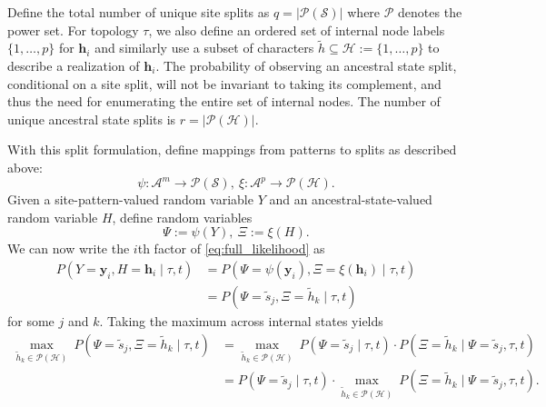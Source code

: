 \documentclass[a4paper]{article}
\newcommand{\alphabet}{\mathcal{A}}
\newcommand{\alignmentColumn}{\mathbf{y}}
\newcommand{\alignmentColumnRV}{Y}
\newcommand{\siteSplit}{\tilde{s}}
\newcommand{\siteSplitSet}{\mathcal{S}}
\newcommand{\ancestralStateColumn}{\mathbf{h}}
\newcommand{\ancestralStateColumnRV}{H}
\newcommand{\ancestralSplit}{\tilde{h}}
\newcommand{\ancestralSplitSet}{\mathcal{H}}
\newcommand{\patternToSplit}{\psi}
\newcommand{\ancestralToSplit}{\xi}
\newcommand{\siteSplitRV}{\Psi}
\newcommand{\ancestralSplitRV}{\Xi}
\newcommand{\nSiteRows}{m}
\newcommand{\nAncestralStateRows}{p}
\newcommand{\nSiteSplits}{q}
\newcommand{\nAncestralSplits}{r}
\begin{document}
Define the total number of unique site splits as $\nSiteSplits=|\mathcal{P}(\siteSplitSet)|$ where $\mathcal{P}$ denotes the power set.
For topology $\tau$, we also define an ordered set of internal node labels $\{1,\ldots,\nAncestralStateRows\}$ for $\ancestralStateColumn_i$ and similarly use a subset of characters $\ancestralSplit\subseteq\ancestralSplitSet:=\{1,\ldots,\nAncestralStateRows\}$ to describe a realization of $\ancestralStateColumn_i$.
The probability of observing an ancestral state split, conditional on a site split, will not be invariant to taking its complement, and thus the need for enumerating the entire set of internal nodes.
The number of unique ancestral state splits is $\nAncestralSplits=|\mathcal{P}(\ancestralSplitSet)|$.

With this split formulation, define mappings from patterns to splits as described above:
$$
\patternToSplit:\alphabet^\nSiteRows\rightarrow\mathcal{P}(\siteSplitSet), \ \ancestralToSplit:\alphabet^\nAncestralStateRows\rightarrow\mathcal{P}(\ancestralSplitSet).
$$
Given a site-pattern-valued random variable $\alignmentColumnRV$ and an ancestral-state-valued random variable $\ancestralStateColumnRV$, define random variables
$$
\siteSplitRV := \patternToSplit(\alignmentColumnRV), \ \ancestralSplitRV := \ancestralToSplit(\ancestralStateColumnRV).
$$
We can now write the $i$th factor of \eqref{eq:full_likelihood} as
\begin{align*}
    P(\alignmentColumnRV=\alignmentColumn_i, \ancestralStateColumnRV=\ancestralStateColumn_i \mid \tau, t) &= P(\siteSplitRV=\patternToSplit(\alignmentColumn_i), \ancestralSplitRV=\ancestralToSplit(\ancestralStateColumn_i) \mid \tau, t) \\
    &= P(\siteSplitRV=\siteSplit_j, \ancestralSplitRV=\ancestralSplit_k \mid \tau, t)
\end{align*}
for some $j$ and $k$.
Taking the maximum across internal states yields
\begin{align*}
\max_{\ancestralSplit_k\in\mathcal{P}(\ancestralSplitSet)} \ P(\siteSplitRV=\siteSplit_j, \ancestralSplitRV=\ancestralSplit_k \mid \tau, t) &=
\max_{\ancestralSplit_k\in\mathcal{P}(\ancestralSplitSet)} \ P(\siteSplitRV=\siteSplit_j \mid  \tau, t)\cdot P(\ancestralSplitRV=\ancestralSplit_k  \mid \siteSplitRV=\siteSplit_j, \tau, t) \\
&= P(\siteSplitRV=\siteSplit_j \mid  \tau, t)\cdot\max_{\ancestralSplit_k\in\mathcal{P}(\ancestralSplitSet)} \ P(\ancestralSplitRV=\ancestralSplit_k  \mid \siteSplitRV=\siteSplit_j, \tau, t).
\end{align*}
\end{document}
